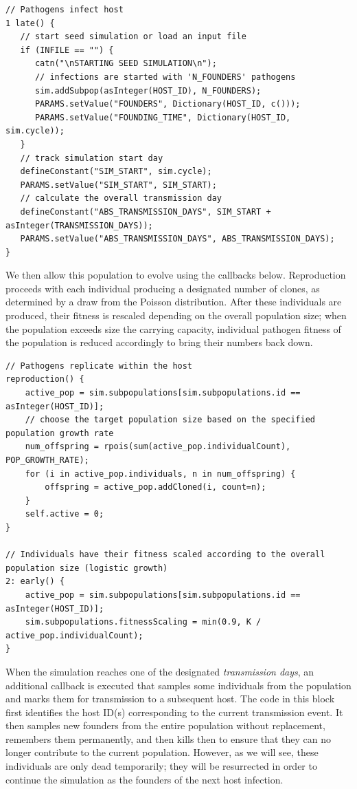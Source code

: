 \documentclass[12pt]{article}
\begin{document}
\begin{lstlisting}[language=slim, style=slimstyle, breaklines=true]
// Pathogens infect host
1 late() {
   // start seed simulation or load an input file
   if (INFILE == "") {
      catn("\nSTARTING SEED SIMULATION\n");
      // infections are started with 'N_FOUNDERS' pathogens
      sim.addSubpop(asInteger(HOST_ID), N_FOUNDERS);
      PARAMS.setValue("FOUNDERS", Dictionary(HOST_ID, c()));
      PARAMS.setValue("FOUNDING_TIME", Dictionary(HOST_ID, sim.cycle));
   }
   // track simulation start day
   defineConstant("SIM_START", sim.cycle);		
   PARAMS.setValue("SIM_START", SIM_START);
   // calculate the overall transmission day
   defineConstant("ABS_TRANSMISSION_DAYS", SIM_START + asInteger(TRANSMISSION_DAYS));
   PARAMS.setValue("ABS_TRANSMISSION_DAYS", ABS_TRANSMISSION_DAYS);
}
\end{lstlisting}

We then allow this population to evolve using the callbacks below. Reproduction proceeds with each individual producing a designated number of clones, as
determined by a draw from the Poisson distribution. After these individuals are produced, their fitness is rescaled depending on the overall population size; when
the population exceeds size the carrying capacity, individual pathogen fitness of the population is reduced accordingly to bring their numbers back down.

\begin{lstlisting}[language=slim, style=slimstyle, breaklines=true]
// Pathogens replicate within the host
reproduction() {
	active_pop = sim.subpopulations[sim.subpopulations.id == asInteger(HOST_ID)];
	// choose the target population size based on the specified population growth rate
	num_offspring = rpois(sum(active_pop.individualCount), POP_GROWTH_RATE);
	for (i in active_pop.individuals, n in num_offspring) {
		offspring = active_pop.addCloned(i, count=n);
	}
	self.active = 0;
}

// Individuals have their fitness scaled according to the overall population size (logistic growth)
2: early() {
	active_pop = sim.subpopulations[sim.subpopulations.id == asInteger(HOST_ID)];
	sim.subpopulations.fitnessScaling = min(0.9, K / active_pop.individualCount);
}
\end{lstlisting}

When the simulation reaches one of the designated \textit{transmission days}, an additional callback is executed that samples some individuals from the
population and marks them for transmission to a subsequent host. The code in this block first identifies the host ID(s) corresponding to the current transmission event.
It then samples new founders from the entire population without replacement, remembers them permanently, and then kills then to ensure that they can no longer
contribute to the current population. However, as we will see, these individuals are only dead temporarily; they will be resurrected in order to
continue the simulation as the founders of the next host infection.
\end{document}
